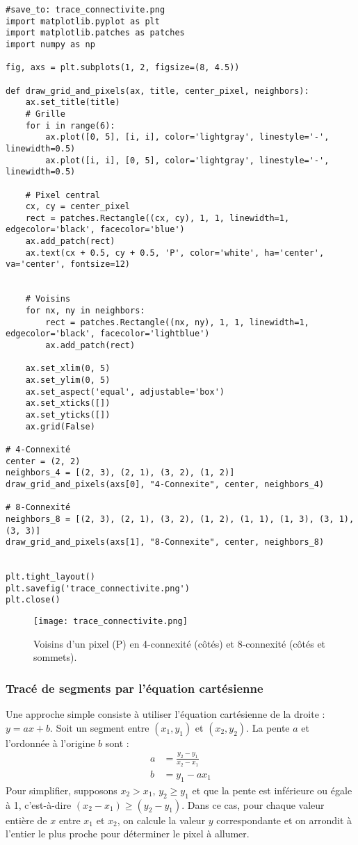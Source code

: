 \documentclass{article}
\begin{document}
\begin{verbatim}
#save_to: trace_connectivite.png
import matplotlib.pyplot as plt
import matplotlib.patches as patches
import numpy as np

fig, axs = plt.subplots(1, 2, figsize=(8, 4.5))

def draw_grid_and_pixels(ax, title, center_pixel, neighbors):
    ax.set_title(title)
    # Grille
    for i in range(6):
        ax.plot([0, 5], [i, i], color='lightgray', linestyle='-', linewidth=0.5)
        ax.plot([i, i], [0, 5], color='lightgray', linestyle='-', linewidth=0.5)

    # Pixel central
    cx, cy = center_pixel
    rect = patches.Rectangle((cx, cy), 1, 1, linewidth=1, edgecolor='black', facecolor='blue')
    ax.add_patch(rect)
    ax.text(cx + 0.5, cy + 0.5, 'P', color='white', ha='center', va='center', fontsize=12)


    # Voisins
    for nx, ny in neighbors:
        rect = patches.Rectangle((nx, ny), 1, 1, linewidth=1, edgecolor='black', facecolor='lightblue')
        ax.add_patch(rect)

    ax.set_xlim(0, 5)
    ax.set_ylim(0, 5)
    ax.set_aspect('equal', adjustable='box')
    ax.set_xticks([])
    ax.set_yticks([])
    ax.grid(False)

# 4-Connexité
center = (2, 2)
neighbors_4 = [(2, 3), (2, 1), (3, 2), (1, 2)]
draw_grid_and_pixels(axs[0], "4-Connexite", center, neighbors_4)

# 8-Connexité
neighbors_8 = [(2, 3), (2, 1), (3, 2), (1, 2), (1, 1), (1, 3), (3, 1), (3, 3)]
draw_grid_and_pixels(axs[1], "8-Connexite", center, neighbors_8)


plt.tight_layout()
plt.savefig('trace_connectivite.png')
plt.close()
\end{verbatim}

\begin{figure}[H]
\centering
\texttt{[image: trace\_connectivite.png]}
\caption{Voisins d'un pixel (P) en 4-connexité (côtés) et 8-connexité (côtés et sommets).}
\label{fig:trace_connectivite}
\end{figure}

\subsubsection{Tracé de segments par l'équation cartésienne}
Une approche simple consiste à utiliser l'équation cartésienne de la droite : $y = ax + b$.
Soit un segment entre $(x_1, y_1)$ et $(x_2, y_2)$. La pente $a$ et l'ordonnée à l'origine $b$ sont :
\begin{align*} a &= \frac{y_2 - y_1}{x_2 - x_1} \\ b &= y_1 - a x_1 \end{align*}
Pour simplifier, supposons $x_2 > x_1$, $y_2 \ge y_1$ et que la pente est inférieure ou égale à 1, c'est-à-dire $(x_2 - x_1) \ge (y_2 - y_1)$. Dans ce cas, pour chaque valeur entière de $x$ entre $x_1$ et $x_2$, on calcule la valeur $y$ correspondante et on arrondit à l'entier le plus proche pour déterminer le pixel à allumer.
\end{document}
